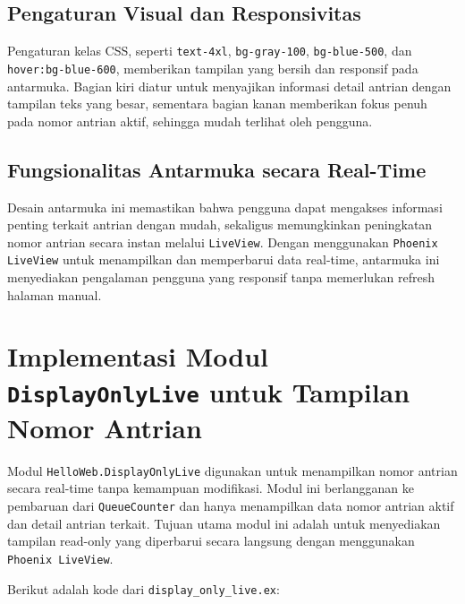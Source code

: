 \subsection{Pengaturan Visual dan Responsivitas}
Pengaturan kelas CSS, seperti \texttt{text-4xl}, \texttt{bg-gray-100}, \texttt{bg-blue-500}, dan \texttt{hover:bg-blue-600}, memberikan tampilan yang bersih dan responsif pada antarmuka. Bagian kiri diatur untuk menyajikan informasi detail antrian dengan tampilan teks yang besar, sementara bagian kanan memberikan fokus penuh pada nomor antrian aktif, sehingga mudah terlihat oleh pengguna.

\subsection{Fungsionalitas Antarmuka secara Real-Time}
Desain antarmuka ini memastikan bahwa pengguna dapat mengakses informasi penting terkait antrian dengan mudah, sekaligus memungkinkan peningkatan nomor antrian secara instan melalui \texttt{LiveView}. Dengan menggunakan \texttt{Phoenix LiveView} untuk menampilkan dan memperbarui data real-time, antarmuka ini menyediakan pengalaman pengguna yang responsif tanpa memerlukan refresh halaman manual.

\section{Implementasi Modul \texttt{DisplayOnlyLive} untuk Tampilan Nomor Antrian}

Modul \texttt{HelloWeb.DisplayOnlyLive} digunakan untuk menampilkan nomor antrian secara real-time tanpa kemampuan modifikasi. Modul ini berlangganan ke pembaruan dari \texttt{QueueCounter} dan hanya menampilkan data nomor antrian aktif dan detail antrian terkait. Tujuan utama modul ini adalah untuk menyediakan tampilan read-only yang diperbarui secara langsung dengan menggunakan \texttt{Phoenix LiveView}.

Berikut adalah kode dari \texttt{display\_only\_live.ex}:

